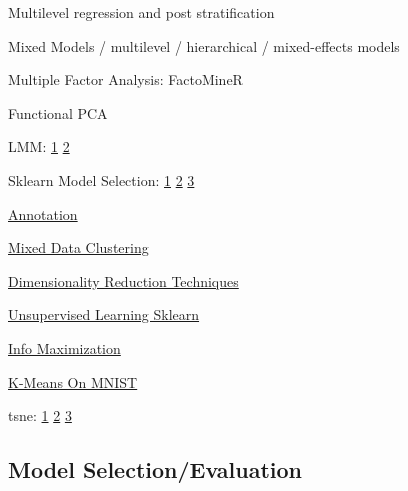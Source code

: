 \documentclass[]{book}
\begin{document}
Multilevel regression and post stratification

Mixed Models / multilevel / hierarchical / mixed-effects models

Multiple Factor Analysis: FactoMineR

Functional PCA

LMM:
\href{http://edwardlib.org/tutorials/linear-mixed-effects-models}{1}
\textbar{}
\href{https://ourcodingclub.github.io/2017/03/15/mixed-models.html}{2}

Sklearn Model Selection:
\href{http://scikit-learn.org/stable/modules/generated/sklearn.model_selection.GroupKFold.html}{1}
\textbar{}
\href{http://scikit-learn.org/stable/modules/generated/sklearn.model_selection.LeaveOneGroupOut.html}{2}
\textbar{}
\href{http://scikit-learn.org/stable/modules/generated/sklearn.model_selection.LeavePGroupsOut.html}{3}

\href{https://explosion.ai/blog/prodigy-annotation-tool-active-learning}{Annotation}

\href{https://www.r-bloggers.com/clustering-mixed-data-types-in-r/}{Mixed
Data Clustering}

\href{https://colah.github.io/posts/2014-10-Visualizing-MNIST/}{Dimensionality
Reduction Techniques}

\href{http://opensource.datacratic.com/mtlpy50/}{Unsupervised Learning
Sklearn}

\href{http://www.inference.vc/unsupervised-learning-by-predicting-noise-an-information-maximization-view-2/}{Info
Maximization}

\href{http://johnloeber.com/docs/kmeans.html}{K-Means On MNIST}

tsne: \href{http://distill.pub/2016/misread-tsne/}{1} \textbar{}
\href{https://lvdmaaten.github.io/tsne/}{2} \textbar{}
\href{https://index.pocketcluster.io/harveyslash-tsne-embedding-visualisation.html}{3}

\subsection{Model Selection/Evaluation}\label{model-selectionevaluation}
\end{document}
